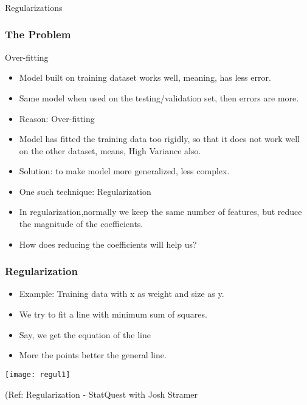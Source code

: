 \begin{frame}[fragile]\frametitle{}
\begin{center}
{\Large Regularizations}
\end{center}
\end{frame}

\begin{frame}[fragile]\frametitle{The Problem}
Over-fitting

\begin{itemize}
\item Model built on training dataset works well, meaning, has less error.
\item Same model when used on the testing/validation set, then errors are more.
\item Reason: Over-fitting
\item Model has fitted the training data too rigidly, so that it does not work well on the other dataset, means, High Variance also.
\item Solution: to make model more generalized, less complex.
\item One such technique: Regularization
\item In regularization,normally we keep the same number of features, but reduce the magnitude of the coefficients. 
\item How does reducing the coefficients will help us?
\end{itemize}
\end{frame}

\begin{frame}[fragile]\frametitle{Regularization}
\begin{itemize}
\item Example: Training data with x as weight and size as y.
\item We try to fit a line with minimum sum of squares. 
\item Say, we get the equation of the line
\item More the points better the general line.
\end{itemize}

\begin{center}
\texttt{[image: regul1]}
\end{center}

{\tiny (Ref: Regularization - StatQuest with Josh Stramer}
\end{frame}


